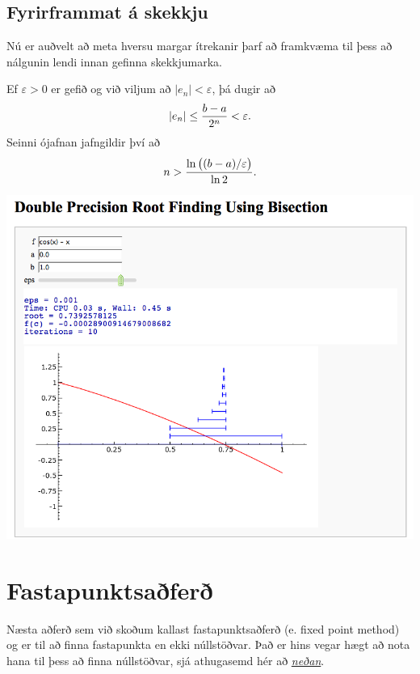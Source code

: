 \documentclass[A4paper,10pt,icelandic]{sphinxmanual}
\begin{document}
\subsection{Fyrirframmat á skekkju}
\label{kafli02:fyrirframmat-a-skekkju}
Nú er auðvelt að meta hversu margar ítrekanir þarf að framkvæma til þess
að nálgunin lendi innan gefinna skekkjumarka.

Ef \(\varepsilon>0\) er gefið og við viljum að
\(|e_n|< \varepsilon\), þá dugir að
\begin{gather}
\begin{split}|e_n|\leq \dfrac{b-a}{2^{n}} <\varepsilon.\end{split}\notag
\end{gather}
Seinni ójafnan jafngildir því að
\begin{gather}
\begin{split}n>\dfrac{\ln\big((b-a)/\varepsilon\big)}{\ln 2}.\end{split}\notag
\end{gather}

\begin{center}
\includegraphics[width=8 cm,keepaspectratio=true]{bisection.png}

\end{center}

\section{Fastapunktsaðferð}
\label{kafli02:fastapunktsafer}\label{kafli02:index-2}
Næsta aðferð sem við skoðum kallast fastapunktsaðferð (e. fixed point method) og
er til að finna fastapunkta en ekki núllstöðvar. Það er hins vegar hægt að
nota hana til þess að finna núllstöðvar, sjá athugasemd hér að {\hyperref[kafli02:fastapunktar-nullstodvar]{\emph{neðan}}}.
\end{document}
